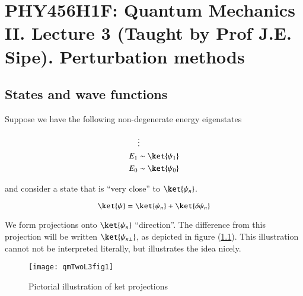 %
%

\chapter{PHY456H1F: Quantum Mechanics II.  Lecture 3 (Taught by Prof J.E. Sipe).  Perturbation methods}
\label{chap:qmTwoL3}
{}
\date{Sept 19, 2011}

\beginArtWithToc

%

\section{States and wave functions}

Suppose we have the following non-degenerate energy eigenstates

\begin{align*}
&\vdots \\
E_1 &\sim \ket{\psi_1} \\
E_0 &\sim \ket{\psi_0}
\end{align*}

and consider a state that is ``very close'' to $\ket{\psi_n}$.

\begin{equation}\label{eqn:qmTwoL3:10}
\ket{\psi} = \ket{\psi_n} + \ket{\delta \psi_n}
\end{equation}

We form projections onto $\ket{\psi_n}$ ``direction''.  The difference from this projection will be written $\ket{\psi_{n \perp}}$, as depicted in figure (\ref{fig:qmTwoL3:1}).  This illustration cannot not be interpreted literally, but illustrates the idea nicely.

\begin{figure}[htp]
\centering
\texttt{[image: qmTwoL3fig1]}
\caption{Pictorial illustration of ket projections}\label{fig:qmTwoL3:1}
\end{figure}

